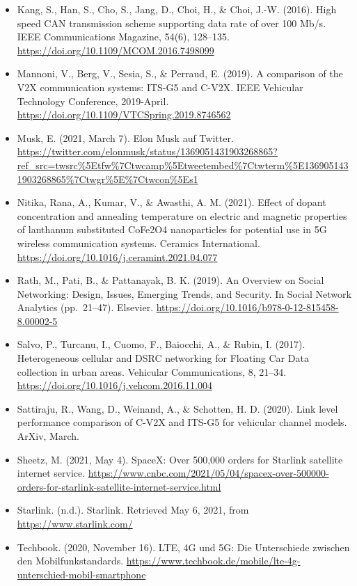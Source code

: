 \documentclass[
]{book}
\begin{document}
\begin{itemize}
\item
  Kang, S., Han, S., Cho, S., Jang, D., Choi, H., \& Choi, J.-W. (2016). High speed CAN transmission scheme supporting data rate of over 100 Mb/s. IEEE Communications Magazine, 54(6), 128--135. \url{https://doi.org/10.1109/MCOM.2016.7498099}
\item
  Mannoni, V., Berg, V., Sesia, S., \& Perraud, E. (2019). A comparison of the V2X communication systems: ITS-G5 and C-V2X. IEEE Vehicular Technology Conference, 2019-April. \url{https://doi.org/10.1109/VTCSpring.2019.8746562}
\item
  Musk, E. (2021, March 7). Elon Musk auf Twitter. \url{https://twitter.com/elonmusk/status/1369051431903268865?ref_src=twsrc\%5Etfw\%7Ctwcamp\%5Etweetembed\%7Ctwterm\%5E1369051431903268865\%7Ctwgr\%5E\%7Ctwcon\%5Es1}
\item
  Nitika, Rana, A., Kumar, V., \& Awasthi, A. M. (2021). Effect of dopant concentration and annealing temperature on electric and magnetic properties of lanthanum substituted CoFe2O4 nanoparticles for potential use in 5G wireless communication systems. Ceramics International. \url{https://doi.org/10.1016/j.ceramint.2021.04.077}
\item
  Rath, M., Pati, B., \& Pattanayak, B. K. (2019). An Overview on Social Networking: Design, Issues, Emerging Trends, and Security. In Social Network Analytics (pp.~21--47). Elsevier. \url{https://doi.org/10.1016/b978-0-12-815458-8.00002-5}
\item
  Salvo, P., Turcanu, I., Cuomo, F., Baiocchi, A., \& Rubin, I. (2017). Heterogeneous cellular and DSRC networking for Floating Car Data collection in urban areas. Vehicular Communications, 8, 21--34. \url{https://doi.org/10.1016/j.vehcom.2016.11.004}
\item
  Sattiraju, R., Wang, D., Weinand, A., \& Schotten, H. D. (2020). Link level performance comparison of C-V2X and ITS-G5 for vehicular channel models. ArXiv, March.
\item
  Sheetz, M. (2021, May 4). SpaceX: Over 500,000 orders for Starlink satellite internet service. \url{https://www.cnbc.com/2021/05/04/spacex-over-500000-orders-for-starlink-satellite-internet-service.html}
\item
  Starlink. (n.d.). Starlink. Retrieved May 6, 2021, from \url{https://www.starlink.com/}
\item
  Techbook. (2020, November 16). LTE, 4G und 5G: Die Unterschiede zwischen den Mobilfunkstandards. \url{https://www.techbook.de/mobile/lte-4g-unterschied-mobil-smartphone}

\end{itemize}
\end{document}

